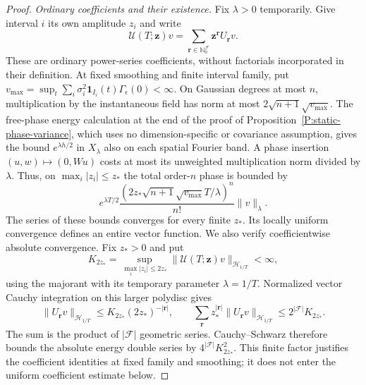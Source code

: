\documentclass[12pt,oneside,openany]{book}
\numberwithin{equation}{section}
\theoremstyle{nogostyle}
\theoremstyle{definition}
\newcommand{\N}{\mathbb{N}}
\begin{document}
\begin{proof}
  \emph{Ordinary coefficients and their existence.} Fix $\lambda > 0$
  temporarily. Give interval $i$ its own amplitude $z_i$ and write
  \[
    \mathcal{U}(T;\boldsymbol z)v
    =\sum_{\boldsymbol r\in\N_0^{\mathcal{F}}}
    \boldsymbol z^{\boldsymbol r}U_{\boldsymbol r}v.
  \]
  These are ordinary power-series coefficients, without factorials incorporated
  in their definition. At fixed smoothing and finite interval family, put
  $v_{\max} = \sup_t\sum_i\sigma_i^2\mathbf1_{I_i}(t) \Gamma_\epsilon(0) <
  \infty$. On Gaussian degrees at most $n$, multiplication by the instantaneous
  field has norm at most $2\sqrt{n+1}\sqrt{v_{\max}}$. The free-phase energy
  calculation at the end of the proof of
  Proposition~\ref{P:static-phase-variance}, which uses no dimension-specific
  or covariance assumption, gives the bound $e^{\lambda h/2}$ in $X_\lambda$
  also on each spatial Fourier band. A phase insertion
  $(u,w)\mapsto(0,Wu)$ costs at most its unweighted multiplication norm divided
  by $\lambda$. Thus, on $\max_i|z_i| \le z_*$ the total order-$n$ phase is
  bounded by
  \begin{equation}\label{E:interval-entire-majorant}
    e^{\lambda T/2}
    \frac{(2z_*\sqrt{n+1}\sqrt{v_{\max}}T/\lambda)^n}{n!}
    \|v\|_\lambda .
  \end{equation}
  The series of these bounds converges for every finite $z_*$. Its locally
  uniform convergence defines an entire vector function. We also verify
  coefficientwise absolute convergence. Fix $z_* > 0$ and put
  \[
    K_{2z_*}=\sup_{\max_i|z_i|\le2z_*}
    \|\mathcal{U}(T;\boldsymbol z)v\|_{\mathcal{H}_{1/T}}<\infty,
  \]
  using the majorant with its temporary parameter $\lambda = 1/T$. Normalized
  vector Cauchy integration on this larger polydisc gives
  \[
    \|U_{\boldsymbol r}v\|_{\mathcal{H}_{1/T}}
    \le K_{2z_*}(2z_*)^{-|\boldsymbol r|},\qquad
    \sum_{\boldsymbol r}z_*^{|\boldsymbol r|}
    \|U_{\boldsymbol r}v\|_{\mathcal{H}_{1/T}}
    \le2^{|\mathcal{F}|}K_{2z_*}.
  \]
  The sum is the product of $|\mathcal{F}|$ geometric series. Cauchy--Schwarz
  therefore bounds the absolute energy double series by
  $4^{|\mathcal{F}|}K_{2z_*}^2$. This finite factor justifies the coefficient
  identities at fixed family and smoothing; it does not enter the uniform
  coefficient estimate below.



\end{proof}
\end{document}
